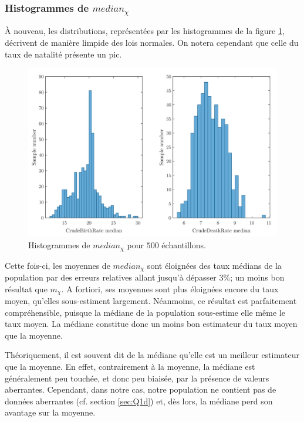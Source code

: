 \documentclass[a4paper, 12pt]{article}
\begin{document}
	\subsubsection{Histogrammes de $median_{\chi}$} \label{sec:Q2bii}
	À nouveau, les distributions, représentées par les histogrammes de la figure \ref{figure:Q2bii}, décrivent de manière limpide des lois normales. On notera cependant que celle du taux de natalité présente un pic. \par
	\begin{figure}[h!]
		\centering
		\includegraphics[scale=0.24]{resources/pdf/q2bii.pdf}
		\caption{Histogrammes de $median_{\chi}$ pour $500$ échantillons.}
		\label{figure:Q2bii}
	\end{figure} 
	Cette fois-ci, les moyennes de $median_{\chi}$ sont éloignées des taux médians de la population par des erreurs relatives allant jusqu'à dépasser $3 \%$; un moins bon résultat que $m_{\chi}$. A fortiori, ses moyennes sont plus éloignées encore du taux moyen, qu'elles sous-estiment largement. Néanmoins, ce résultat est parfaitement compréhensible, puisque la médiane de la population sous-estime elle même le taux moyen. La médiane constitue donc un moins bon estimateur du taux moyen que la moyenne. \par
	Théoriquement, il est souvent dit de la médiane qu'elle est un meilleur estimateur que la moyenne. En effet, contrairement à la moyenne, la médiane est généralement peu touchée, et donc peu biaisée, par la présence de valeurs aberrantes. Cependant, dans notre cas, notre population ne contient pas de données aberrantes (cf. section \ref{sec:Q1d}) et, dès lors, la médiane perd son avantage sur la moyenne.
\end{document}
